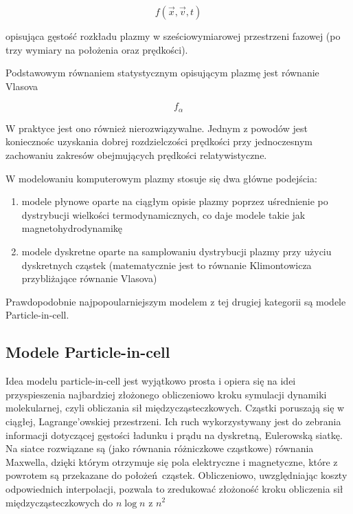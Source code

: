 \begin{equation}
    f(\vec{x}, \vec{v}, t)
\end{equation}

opisująca gęstość rozkładu plazmy w sześciowymiarowej przestrzeni fazowej (po trzy wymiary na położenia oraz prędkości).

Podstawowym równaniem statystycznym opisującym plazmę jest równanie Vlasova %

\begin{equation}
    f_{\alpha}
\end{equation}

W praktyce jest ono również nierozwiązywalne. Jednym z powodów jest koniecznośc uzyskania dobrej rozdzielczości prędkości
przy jednoczesnym zachowaniu zakresów obejmujących prędkości relatywistyczne. %

W modelowaniu komputerowym plazmy stosuje się dwa główne podejścia:
\begin{enumerate}
    \item modele płynowe oparte na ciągłym opisie plazmy poprzez uśrednienie po dystrybucji
        wielkości termodynamicznych, co daje modele takie jak magnetohydrodynamikę %
    \item modele dyskretne oparte na samplowaniu dystrybucji plazmy przy użyciu dyskretnych cząstek
        (matematycznie jest to równanie Klimontowicza przybliżające równanie Vlasova) %
\end{enumerate}

Prawdopodobnie najpopoularniejszym modelem z tej drugiej kategorii są modele Particle-in-cell. 

\subsection{Modele Particle-in-cell}

Idea modelu particle-in-cell jest wyjątkowo prosta i opiera się na idei przyspieszenia najbardziej złożonego obliczeniowo kroku
symulacji dynamiki molekularnej, czyli obliczania sił międzycząsteczkowych. Cząstki poruszają się w ciągłej, Lagrange'owskiej przestrzeni.
Ich ruch wykorzystywany jest do zebrania informacji dotyczącej gęstości ładunku i prądu na dyskretną, Eulerowską siatkę. Na siatce rozwiązane
są (jako równania różniczkowe cząstkowe) równania Maxwella, dzięki którym otrzymuje się pola elektryczne i magnetyczne, które z powrotem są przekazane
do położeń cząstek. Obliczeniowo, uwzględniając koszty odpowiednich interpolacji, pozwala to zredukować złożoność kroku obliczenia sił międzycząsteczkowych
do $n \log{n}$ z $n^2$ %


